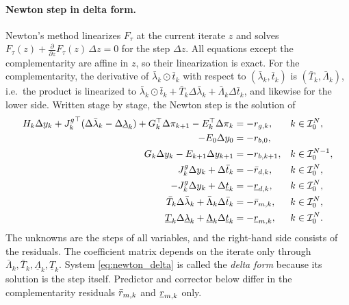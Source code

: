 \paragraph{Newton step in delta form.}
Newton's method linearizes $F_\tau$ at the current iterate $z$ and solves $F_\tau(z) + \frac{\partial}{\partial z} F_\tau(z)\, \Delta z = 0$ for the step $\Delta z$.
All equations except the complementarity are affine in $z$, so their linearization is exact.
For the complementarity, the derivative of $\bar{\lambda}_k \odot \bar{t}_k$ with respect to $(\bar{\lambda}_k, \bar{t}_k)$ is $(\bar{T}_k, \bar{\Lambda}_k)$, i.e.\ the product is linearized to $\bar{\lambda}_k \odot \bar{t}_k + \bar{T}_k \Delta\bar{\lambda}_k + \bar{\Lambda}_k \Delta\bar{t}_k$, and likewise for the lower side.
Written stage by stage, the Newton step is the solution of
\begin{subequations} \label{eq:newton_delta}
\begin{align}
    H_k \Delta y_k + {J^{g}_{k}}^\top(\Delta\bar{\lambda}_k - \Delta\underline{\lambda}_k) + G_k^\top \Delta\pi_{k+1} - E_k^\top \Delta\pi_k &= -r_{g,k} , && k\in\mathcal{I}_{0}^{N}, \label{eq:nd_stat}\\
    -E_0 \Delta y_0 &= -r_{b,0} , && \label{eq:nd_init}\\
    G_k \Delta y_k - E_{k+1}\Delta y_{k+1} &= -r_{b,k+1} , && k\in\mathcal{I}_{0}^{N-1}, \label{eq:nd_dyn}\\
    {J^{g}_{k}} \Delta y_k + \Delta\bar{t}_k &= -\bar{r}_{d,k} , && k\in\mathcal{I}_{0}^{N}, \label{eq:nd_up}\\
    -{J^{g}_{k}} \Delta y_k + \Delta\underline{t}_k &= -\underline{r}_{d,k} , && k\in\mathcal{I}_{0}^{N}, \label{eq:nd_lo}\\
    \bar{T}_k \Delta\bar{\lambda}_k + \bar{\Lambda}_k \Delta\bar{t}_k &= -\bar{r}_{m,k} , && k\in\mathcal{I}_{0}^{N}, \label{eq:nd_cup}\\
    \underline{T}_k \Delta\underline{\lambda}_k + \underline{\Lambda}_k \Delta\underline{t}_k &= -\underline{r}_{m,k} , && k\in\mathcal{I}_{0}^{N}. \label{eq:nd_clo}
\end{align}
\end{subequations}
The unknowns are the steps of all variables, and the right-hand side consists of the residuals.
The coefficient matrix depends on the iterate only through $\bar{\Lambda}_k, \bar{T}_k, \underline{\Lambda}_k, \underline{T}_k$.
System \eqref{eq:newton_delta} is called the \textit{delta form} because its solution is the step itself.
Predictor and corrector below differ in the complementarity residuals $\bar{r}_{m,k}$ and $\underline{r}_{m,k}$ only.

\newpage
